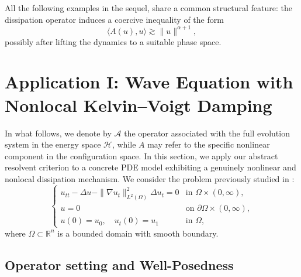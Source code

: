 \documentclass[11pt,reqno]{amsart}
\theoremstyle{remark}
\newcommand{\R}{\mathbb{R}}
\begin{document}
\medskip

All the following examples in the sequel, share a common structural feature:
the dissipation operator induces a coercive inequality of the form
\[
\langle A(u),u\rangle \gtrsim \|u\|^{\alpha+1},
\]
possibly after lifting the dynamics to a suitable phase space.

\medskip
\section{Application I: Wave Equation with Nonlocal Kelvin--Voigt Damping}
\label{sec:app_kv}
In what follows, we denote by $\mathcal{A}$ the operator associated with the full evolution system in the energy space $\mathcal{H}$, while $A$ may refer to the specific nonlinear component in the configuration space.
In this section, we apply our abstract resolvent criterion to a concrete PDE model
exhibiting a genuinely nonlinear and nonlocal dissipation mechanism. We consider the
problem previously studied in \cite{Cavalcanti2025}:
\begin{equation}\label{eq:wave_nonlinear}
\begin{cases}
    u_{tt} - \Delta u - \|\nabla u_t\|_{L^2(\Omega)}^2 \Delta u_t = 0 & \text{in } \Omega \times (0, \infty), \\
    u = 0 & \text{on } \partial\Omega \times (0, \infty), \\
    u(0) = u_0, \quad u_t(0) = u_1 & \text{in } \Omega,
\end{cases}
\end{equation}
where $\Omega \subset \R^n$ is a bounded domain with smooth boundary.

\subsection{Operator setting and Well-Posedness}
\end{document}
